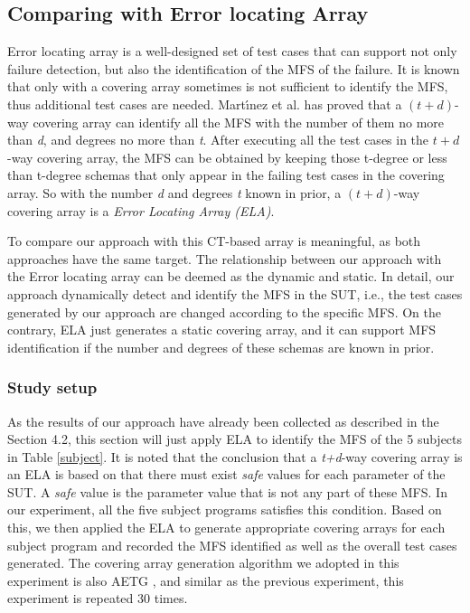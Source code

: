 \documentclass{sig-alternate}
\begin{document}
\subsection{Comparing with Error locating Array}
Error locating array\cite{colbourn2008locating,martinez2009locating} is a well-designed set of test cases that can support not only failure detection, but also the identification of the MFS of the failure. It is known that only with a covering array sometimes is not sufficient to identify the MFS, thus additional test cases are needed. Mart{\'\i}nez et al.\cite{martinez2008algorithms} has proved that a $(t + d)$-way covering array can identify all the MFS with the number of them no more than \emph{d}, and degrees no more than \emph{t}.
After executing all the test cases in the $t+d$-way covering array, the MFS can be obtained by keeping those t-degree or less than t-degree schemas that only appear in the failing test cases in the covering array.  So with the number \emph{d} and degrees \emph{t} known in prior, a $(t+d)$-way covering array is a \emph{Error Locating Array (ELA)}.


To compare our approach with this CT-based array is meaningful, as both approaches have the same target. The relationship between our approach with the Error locating array can be deemed as the dynamic and static. In detail, our approach dynamically detect and identify the MFS in the SUT, i.e., the test cases generated by our approach are changed according to the specific MFS. On the contrary, ELA just generates a static covering array, and it can support MFS identification if the number and degrees of these schemas are known in prior.



\subsubsection{Study setup}
As the results of our approach have already been collected as described in the Section 4.2, this section will just apply ELA to identify the MFS of the 5 subjects in Table \ref{subject}. It is noted that the conclusion that a \emph{t+d}-way covering array is an ELA
 is based on that there must exist \emph{safe} values for each parameter of the SUT. A \emph{safe} value is the parameter value that is not any part of these MFS. In our experiment, all the five subject programs satisfies this condition. Based on this, we then applied the ELA to generate appropriate covering arrays for each subject program and recorded the MFS identified as well as the overall test cases generated. The covering array generation algorithm we adopted in this experiment is also AETG \cite{cohen1997aetg}, and similar as the previous experiment, this experiment is repeated 30 times.
\end{document}
